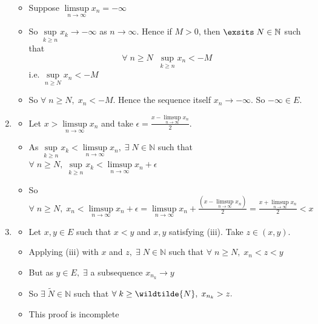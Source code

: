 \documentclass[12pt]{article}
\begin{document}
\begin{enumerate}[label=(\roman*)]
\begin{itemize}
            \item Suppose $\limsup\limits_{n\to\infty} x_n =-\infty$
            \item So $\sup\limits_{k\ge n} x_k\to -\infty$ as $n\to \infty$. Hence if $M>0$, then $\exsits\;N\in\mathbb{N}$ such that $$\forall\; n\ge N\;\;\sup\limits_{k\ge n} x_n <-M$$
            \hfill i.e. $\sup\limits_{n\ge N} x_n < -M$
            \item So $\forall\;n\ge N,\; x_n <-M$. Hence the sequence itself $x_n\to -\infty$. So $-\infty \in E$.
        \end{itemize}
        
    \item 
    \begin{itemize}
        \item Let $x>\limsup\limits_{n\to\infty} x_n$ and take $\epsilon = \frac{x-\limsup\limits_{n\to\infty} x_n}{2}.$
        \item As $\sup\limits_{k\ge n} x_k < \limsup\limits_{n\to\infty} x_n,\; \exists\; N\in\mathbb{N}$ such that $\forall\;n\ge N,\; \sup\limits_{k\ge n} x_k < \limsup\limits_{n\to\infty} x_n + \epsilon$
        \item So $\forall\;n\ge N,\;x_n < \limsup\limits_{n\to\infty} x_n+\epsilon = \limsup\limits_{n\to\infty} x_n +\frac{\left(x-\limsup\limits_{n\to\infty} x_n\right)}{2} = \frac{x+\limsup\limits_{n\to\infty} x_n}{2}<x$
    \end{itemize}
    
    \item
    \begin{itemize}
        \item Let $x,y\in E$ such that $x<y$ and $x,y$ satisfying (iii). Take $z\in(x,y)$.
        \item Applying (iii) with $x$ and $z,\;\exists\;N\in\mathbb{N}$ such that $\forall\; n \ge N,\;x_n<z<y$
        \item But as $y\in E,\;\exists$ a subsequence $x_{n_k}\to y$
        \item So $\exists\; \widetilde{N}\in\mathbb{N}$ such that $\forall\;k\ge \wildtilde{N},\;x_{n_k}>z.$
        \item This proof is incomplete
    \end{itemize}
\end{enumerate}


\end{document}
